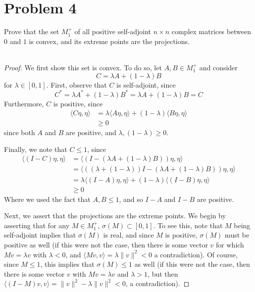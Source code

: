 \documentclass[fontsize=11pt]{scrartcl} %
\numberwithin{equation}{section} %
\numberwithin{figure}{section} %
\numberwithin{table}{section} %
\begin{document}
\newpage
\section*{Problem 4}
Prove that the set $M_1^+$ of all positive self-adjoint $n\times n$ complex
matrices between $0$ and $1$ is convex, and its extreme points are the
projections.
\\
\\
\begin{proof}
    We first show this set is convex. To do so, let $A,B\in M_1^+$ and consider
    \[
        C = \lambda A + (1-\lambda)B
    \]
    for $\lambda\in [0,1]$. First, observe that $C$ is self-adjoint, since
    \[
        C^* = \lambda A^* + (1-\lambda)B^* = \lambda A + (1-\lambda)B = C
    \]
    Furthermore, $C$ is positive, since
    \[
        \begin{aligned}
        \langle C\eta,\eta\rangle &= \lambda\langle A\eta,\eta\rangle +
        (1-\lambda)\langle B\eta,\eta\rangle\\
        &\geq 0
    \end{aligned}
    \]
    since both $A$ and $B$ are positive, and $\lambda, (1-\lambda)\geq0$.

    Finally, we note that $C\leq 1$, since 
    \[
\begin{aligned}
    \langle (I-C)\eta,\eta\rangle &= \langle (I - (\lambda A +
    (1-\lambda)B))\eta,\eta\rangle\\
    &= \langle ((\lambda + (1-\lambda))I - (\lambda A +
    (1-\lambda)B))\eta,\eta\rangle\\
    &= \lambda \langle (I-A)\eta,\eta\rangle + (1-\lambda)\langle
    (I-B)\eta,\eta\rangle\\
    &\geq 0
\end{aligned}
    \]
    Where we used the fact that $A,B\leq 1$, and so $I-A$ and $I-B$ are
    positive.

    Next, we assert that the projections are the extreme points. We begin by
    asserting that for any $M\in M_1^+$, $\sigma(M)\subset [0,1]$. To see this,
    note that $M$ being self-adjoint implies that $\sigma(M)$ is real, and since
    $M$ is positive, $\sigma(M)$ must be positive as well (if this were not the
        case, then there is some vector $v$ for which $Mv = \lambda v$ with
        $\lambda<0$, and $\langle Mv,v\rangle = \lambda\|v\|^2<0$ a
    contradiction).
    Of course, since $M\leq 1$, this implies that $\sigma(M)\leq 1$ as well (if
        this were not the case, then there is some vector $v$ with $Mv=\lambda
        v$ and $\lambda>1$, but then $\langle (I-M)v,v\rangle = \|v\|^2 -
    \lambda\|v\|^2<0$, a contradiction).


\end{proof}
\end{document}
